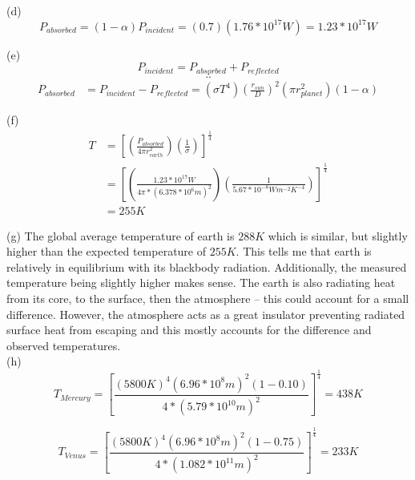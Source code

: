 \documentclass{homework}
\begin{document}
(d) 
\begin{equation*}
    P_{absorbed} = (1-\alpha) P_{incident} = (0.7)(1.76*10^{17} W) = 1.23*10^{17} W
\end{equation*}

(e)
\begin{equation*} P_{incident} = P_{absorbed} + P_{reflected} \end{equation*}
\begin{equation*} \therefore \end{equation*}
\begin{equation*}
    \begin{split}
        P_{absorbed} 
            & = P_{incident} - P_{reflected} = (\sigma T^4) (\frac{r_{sun}}{D})^2 (\pi r^2_{planet})(1-\alpha)
    \end{split}
\end{equation*}

(f)
\begin{equation*}
    \begin{split}
        T 
            & =\left[ (\frac{P_{absorbed}}{4\pi r^2_{earth}})(\frac{1}{\sigma})             
            \right]^\frac{1}{4} \\
            & =\left[ (\frac{1.23*10^{17}W}{4\pi*(6.378*10^{6}m)^2})(\frac{1}{5.67*10^{-8} Wm^{-2}K^{-4}}) \right]^\frac{1}{4} \\
            & = 255 K
    \end{split}
\end{equation*}

(g)
The global average temperature of earth is $288K$ which is similar, but slightly higher than the expected temperature of $255K$. This tells me that earth is relatively in equilibrium with its blackbody radiation. Additionally, the measured temperature being slightly higher makes sense. The earth is also radiating heat from its core, to the surface, then the atmosphere -- this could account for a small difference. However, the atmosphere acts as a great insulator preventing radiated surface heat from escaping and this mostly accounts for the difference and observed temperatures.\\

(h)
\begin{equation*}
    T_{Mercury} =\left[ \frac{(5800K)^4(6.96*10^8 m)^2 (1-0.10)}{4*(5.79*10^{10} m)^2}         \right]^\frac{1}{4} = 438 K 
\end{equation*}

\begin{equation*}
    T_{Venus} =\left[ \frac{(5800K)^4(6.96*10^8 m)^2 (1-0.75)}{4*(1.082*10^{11} m)^2}
    \right]^\frac{1}{4} = 233 K 
\end{equation*}
\end{document}
